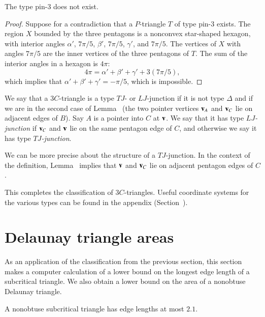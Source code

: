 \begin{lemma}  The type pin-$3$ does not exist.  
\end{lemma}

\begin{proof} 
  Suppose for a contradiction that a $P$-triangle $T$ of type pin-$3$
  exists.  The region $X$ bounded by the three pentagons is a
  nonconvex star-shaped hexagon, with interior angles $\alpha'$,
  $7\pi/5$, $\beta'$, $7\pi/5$, $\gamma'$, and $7\pi/5$.  The vertices
  of $X$ with angles $7\pi/5$ are the inner vertices of the three
  pentagons of $T$.  The sum of the interior angles in a hexagon is
  $4\pi$:
\[
4\pi = \alpha'+\beta'+\gamma' + 3 (7\pi/5),
\]
which implies that $\alpha'+\beta'+\gamma' = -\pi/5$, which is
impossible.
\end{proof}

\begin{definition}
  We say that a $3C$-triangle is a type $TJ$- or $LJ$-junction if it is
  not type $\Delta$ and if we are in the second case of
  Lemma~ (the two pointer vertices ${\mathbf v}_A$ and ${\mathbf v}_C$
  lie on adjacent edges of $B$).  Say $A$ is a pointer into $C$ at
  ${\mathbf v}$.  We say that it has type {\it $LJ$-junction} if ${\mathbf v}_C$ and ${\mathbf v}$
  lie on the same pentagon edge of $C$, and otherwise we say it has
  type {\it $TJ$-junction}.
\end{definition}

We can be more precise about the structure of a $TJ$-junction.  In the
context of the definition, Lemma~ implies that ${\mathbf v}$
and ${\mathbf v}_C$ lie on adjacent pentagon edges of $C$.

This completes the classification of $3C$-triangles.  Useful
coordinate systems for the various types can be found in the appendix
(Section~).

\section{Delaunay triangle areas}

As an application of the classification from the previous section,
this section makes a computer calculation of a lower bound on the
longest edge length of a subcritical triangle.  We also obtain a lower
bound on the area of a nonobtuse Delaunay triangle.



\begin{lemma} 
  A nonobtuse subcritical triangle has edge lengths at most $2.1$.
\end{lemma}


